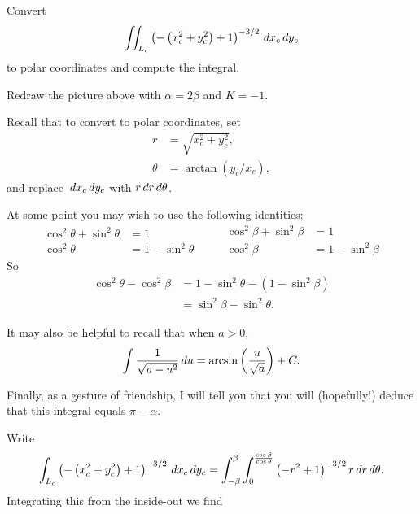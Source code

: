 \documentclass[newpage,hints,12pt,nooutcomes,noauthor,handout]{ximera}
\begin{document}
\begin{problem}
  Convert
  \[
  \iint_{L_c} \left(-\left(x_c^2+y_c^2\right)+1\right)^{-3/2} \,d x_c\,d y_c
  \]
  to polar coordinates and compute the integral.
  \begin{hint}
    Redraw the picture above with $\alpha = 2\beta$ and $K=-1$.
  \end{hint}
  \begin{hint}
    Recall that to convert to polar coordinates, set
    \begin{align*}
      r &= \sqrt{x_c^2+y_c^2},\\
      \theta &= \arctan(y_c/x_c),
    \end{align*}
    and replace $\,d x_c\,d y_c$ with $r\,d r\,d \theta$.
  \end{hint}
  \begin{hint}
    At some point you may wish to use the following identities:
    \[
    \begin{split}
      \cos^2\theta + \sin^2\theta &=1\\
      \cos^2\theta &= 1-\sin^2\theta
    \end{split}
    \qquad
    \begin{split}
      \cos^2\beta + \sin^2\beta &=1\\
      \cos^2\beta &= 1-\sin^2\beta
    \end{split}
    \]
    So
    \begin{align*}
      \cos^2\theta - \cos^2\beta &= 1 - \sin^2\theta - \left(1-\sin^2\beta\right)\\
      &= \sin^2\beta - \sin^2\theta.       
    \end{align*}
  \end{hint}
  \begin{hint}
    It may also be helpful to recall that when $a>0$,
    \[
    \int \frac{1}{\sqrt{a - u^2}} \,d u = \arcsin\left(\frac{u}{\sqrt{a}}\right) + C.
    \]
  \end{hint}
  \begin{hint}
    Finally, as a gesture of friendship, I will tell you that you will
    (hopefully!) deduce that this integral equals $\pi-\alpha$.
  \end{hint}
  \begin{freeResponse}
    Write
    \[
    \int_{L_c} \left(-\left(x_c^2+y_c^2\right)+1\right)^{-3/2} \,d x_c\,d y_c
    = \int_{-\beta}^\beta \int_0^{\frac{\cos \beta}{\cos\theta}}\left(-r^2+1\right)^{-3/2} r\,d r\,d \theta.
    \]
    Integrating this from the inside-out we find
    \begin{align*}

\end{align*}
\end{freeResponse}
\end{problem}
\end{document}
